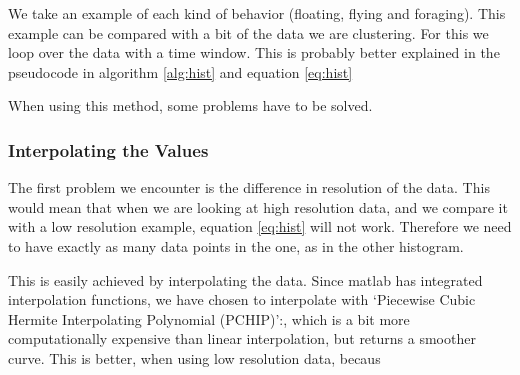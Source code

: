 We take an example of each kind of behavior (floating, flying and foraging).
This example can be compared with a bit of the data we are
clustering. For this we loop over the data with a time window. This is probably
better explained in the pseudocode in algorithm \ref{alg:hist} and equation
\ref{eq:hist}

When using this method, some problems have to be solved.

\subsubsection{Interpolating the Values}
The first problem we encounter is the difference in resolution of the data. This
would mean that when we are looking at high resolution data, and we compare it
with a low resolution example, equation \ref{eq:hist} will not work. Therefore
we need to have exactly as many data points in the one, as in the other
histogram. 

This is easily achieved by interpolating the data. Since matlab has integrated
interpolation functions, we have chosen to interpolate with `Piecewise Cubic
Hermite Interpolating Polynomial (PCHIP)':, which is a bit more computationally
expensive than linear interpolation, but returns a smoother curve. This is
better, when using low resolution data, becaus


